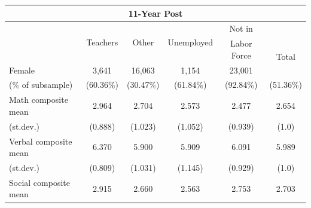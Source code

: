 \documentclass[onehalfspacing,11pt]{article}
\begin{document}
\begin{table}[h!]
		\centering 
		\begin{tabular}{lccccc}
			\toprule
			\multicolumn{6}{c}{11-Year Post} \\
			\midrule
			& \multirow{2}{*}{Teachers} & \multirow{2}{*}{Other} & \multirow{2}{*}{Unemployed}& Not in \\
			&  &  & & Labor Force & \multirow{2}{*}{Total}\\
			\midrule
			Female & 3,641 & 16,063 & 1,154 & 23,001 & 43,859\\
			\quad (\% of subsample) & (60.36\%) & (30.47\%) & (61.84\%) & (92.84\%) &(51.36\%)\\
			\midrule
			Math composite mean & 2.964 & 2.704 & 2.573 & 2.477 & 2.654\\
			\quad (st.dev.) & (0.888) & (1.023) & (1.052) & (0.939) & (1.0) \\
			\midrule
			Verbal composite mean & 6.370 & 5.900 & 5.909 & 6.091 & 5.989\\
			\quad (st.dev.) & (0.809) & (1.031) & (1.145) & (0.929) & (1.0)\\
			\midrule
			Social composite mean & 2.915 & 2.660 & 2.563 & 2.753 & 2.703\\

\end{tabular}
\end{table}
\end{document}
